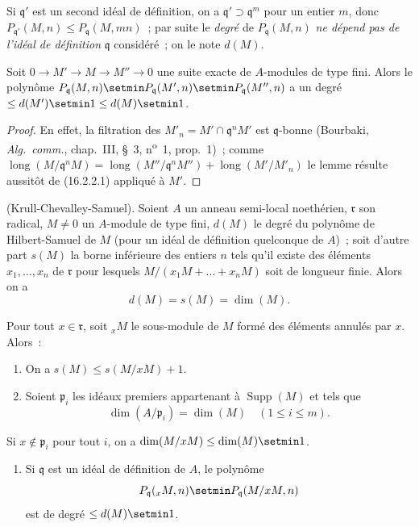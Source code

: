 Si $\mathfrak{q}'$ est un second idéal de définition, on a
$\mathfrak{q}'\supset\mathfrak{q}^m$ pour un entier $m$, donc
$P_{\mathfrak{q}'}(M,n)\leq P_{\mathfrak{q}}(M,mn)$~; par suite le \emph{degré} de
$P_{\mathfrak{q}}(M,n)$ \emph{ne dépend pas de l'idéal de définition}
$\mathfrak{q}$ considéré~; on le note $d(M)$.

\begin{lemma}[16.2.2.2]
\label{0.16.2.2.2-fr}
Soit $0\to M'\to M\to M''\to0$ une suite exacte de $A$-modules de type
fini. Alors le polynôme
$P_{\mathfrak{q}}(M,n)\setmin P_{\mathfrak{q}}(M',n)\setmin P_{\mathfrak{q}}(M'',n)$
a un degré $\leq d(M')\setmin 1\leq d(M)\setmin 1$.
\end{lemma}

\begin{proof}
En effet, la filtration des
$M'_n=M'\cap\mathfrak{q}^nM'$ est $\mathfrak{q}$-bonne (Bourbaki,
\emph{Alg.~comm.}, chap.~III, \S~3, n\textsuperscript{o}~1, prop.~1)~; comme
$\operatorname{long}(M/\mathfrak{q}^nM)=\operatorname{long}(M''/\mathfrak{q}^nM'')+\operatorname{long}(M'/M'_n)$
le lemme résulte aussitôt de (16.2.2.1) appliqué à $M'$.
\end{proof}

\begin{theorem}[16.2.3]
\label{0.16.2.3-fr}
\textup{(Krull-Chevalley-Samuel).}
Soient $A$ un anneau semi-local noethérien, $\mathfrak{r}$ son radical,
$M\neq0$ un $A$-module de type fini, $d(M)$ le degré du polynôme de
Hilbert-Samuel de $M$ (pour un idéal de définition quelconque de $A$)~; soit
d'autre part $s(M)$ la borne inférieure des entiers $n$ tels qu'il existe des
éléments $x_1,\ldots,x_n$ de $\mathfrak{r}$ pour lesquels
$M/(x_1M+\ldots+x_nM)$ soit de longueur finie. Alors on a
\[
  d(M)=s(M)=\dim(M).
\]
\end{theorem}

\begin{lemma}[16.2.3.1]
\label{0.16.2.3.1-fr}
Pour tout $x\in\mathfrak{r}$, soit ${}_xM$ le sous-module de $M$ formé des
éléments annulés par $x$. Alors~:
\begin{enumerate}
  \item[\rm{(i)}] On a $s(M)\leq s(M/xM)+1$.
  \item[\rm{(ii)}] Soient $\mathfrak{p}_i$ les idéaux premiers appartenant à
  $\operatorname{Supp}(M)$ et tels que
  \[
    \dim(A/\mathfrak{p}_i)=\dim(M)\quad(1\leq i\leq m).
  \]
\end{enumerate}
Si $x\notin\mathfrak{p}_i$ pour tout $i$, on a
$\dim(M/xM)\leq\dim(M)\setmin 1$.
\begin{enumerate}
  \item[\rm{(iii)}] Si $\mathfrak{q}$ est un idéal de définition de $A$, le
  polynôme
  \[
    P_{\mathfrak{q}}({}_xM,n)\setmin P_{\mathfrak{q}}(M/xM,n)
  \]
  est de degré $\leq d(M)\setmin 1$.
\end{enumerate}
\end{lemma}

